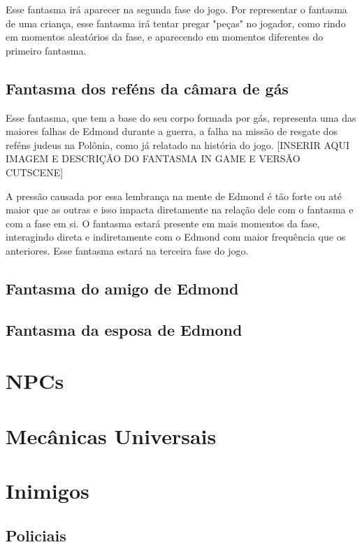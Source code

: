 \documentclass{article}
\begin{document}
 Esse fantasma irá aparecer na segunda fase do jogo. Por representar o fantasma de uma criança, esse fantasma irá tentar pregar "peças" no jogador, como rindo em momentos aleatórios da fase, e  aparecendo em momentos diferentes do primeiro fantasma.
 
\subsection{Fantasma dos reféns da câmara de gás}
Esse fantasma, que tem a base do seu corpo formada por gás, representa uma das maiores falhas de Edmond durante a guerra, a falha na missão de resgate dos reféns judeus na Polônia, como já relatado na história do jogo. [INSERIR AQUI IMAGEM E DESCRIÇÃO DO FANTASMA IN GAME E VERSÃO CUTSCENE]

A pressão causada por essa lembrança na mente de Edmond é tão forte ou até maior que as outras e isso impacta diretamente na relação dele com o fantasma e com a fase em si. O fantasma estará presente em mais momentos da fase, interagindo direta e indiretamente com o Edmond com maior frequência que os anteriores. Esse fantasma estará na terceira fase do jogo.

\subsection{Fantasma do amigo de Edmond}


\subsection{Fantasma da esposa de Edmond}

\subsection{}

\section{NPCs}
\section{Mecânicas Universais}
\section{Inimigos}
\subsection{Policiais}
\end{document}
